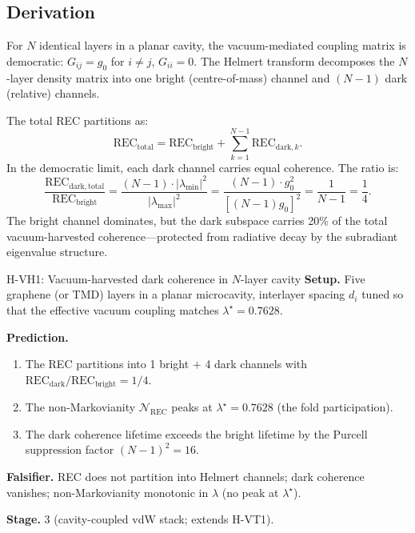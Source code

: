 \documentclass[11pt,letterpaper]{article}
\newcommand{\gzero}{g_0}
\newcommand{\lastar}{\lambda^{\!\star}}
\begin{document}
\subsection{Derivation}
For $N$ identical layers in a planar cavity, the vacuum-mediated coupling matrix is democratic: $G_{ij} = \gzero$ for $i \neq j$, $G_{ii} = 0$.  The Helmert transform decomposes the $N$-layer density matrix into one bright (centre-of-mass) channel and $(N{-}1)$ dark (relative) channels.

The total REC partitions as:
\begin{equation}\label{eq:rec_partition}
  \mathrm{REC}_{\mathrm{total}} = \mathrm{REC}_{\mathrm{bright}} + \sum_{k=1}^{N-1} \mathrm{REC}_{\mathrm{dark},k}.
\end{equation}
In the democratic limit, each dark channel carries equal coherence.  The ratio is:
\begin{equation}\label{eq:rec_ratio}
  \frac{\mathrm{REC}_{\mathrm{dark,total}}}{\mathrm{REC}_{\mathrm{bright}}}
  = \frac{(N{-}1) \cdot |\lambda_{\min}|^2}{|\lambda_{\max}|^2}
  = \frac{(N{-}1) \cdot \gzero^2}{[(N{-}1)\gzero]^2}
  = \frac{1}{N{-}1} = \frac{1}{4}.
\end{equation}
The bright channel dominates, but the dark subspace carries 20\% of the total vacuum-harvested coherence---protected from radiative decay by the subradiant eigenvalue structure.

\begin{hypothesis}{H-VH1: Vacuum-harvested dark coherence in $N$-layer cavity}
\textbf{Setup.}  Five graphene (or TMD) layers in a planar microcavity, interlayer spacing $d_i$ tuned so that the effective vacuum coupling matches $\lastar = 0.7628$.

\textbf{Prediction.}
\begin{enumerate}[nosep]
  \item The REC partitions into 1 bright $+$ 4 dark channels with $\mathrm{REC}_{\mathrm{dark}}/\mathrm{REC}_{\mathrm{bright}} = 1/4$.
  \item The non-Markovianity $\mathcal{N}_{\mathrm{REC}}$ peaks at $\lastar = 0.7628$ (the fold participation).
  \item The dark coherence lifetime exceeds the bright lifetime by the Purcell suppression factor $(N{-}1)^2 = 16$.
\end{enumerate}

\textbf{Falsifier.}  REC does not partition into Helmert channels; dark coherence vanishes; non-Markovianity monotonic in $\lambda$ (no peak at $\lastar$).

\textbf{Stage.}  3 (cavity-coupled vdW stack; extends H-VT1).
\end{hypothesis}
\end{document}
